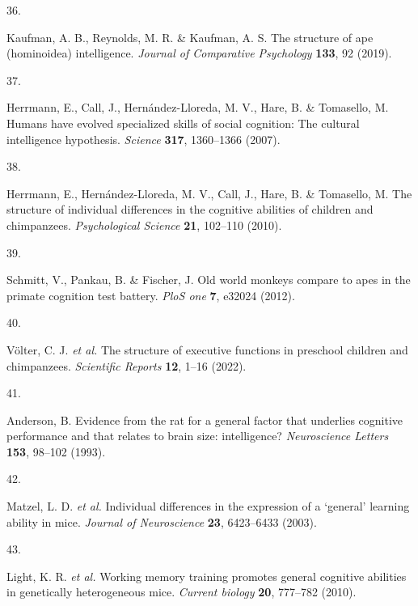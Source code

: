\documentclass[
  man,floatsintext]{apa6}
\newlength{\cslhangindent}
\newlength{\csllabelwidth}
\newlength{\cslentryspacingunit} %
\newenvironment{CSLReferences}[2] %
 {%
  \setlength{\parindent}{0pt}
  \ifodd #1
  \let\oldpar\par
  \def\par{\hangindent=\cslhangindent\oldpar}
  \fi
  \setlength{\parskip}{#2\cslentryspacingunit}
 }%
 {}
\newcommand{\CSLLeftMargin}[1]{\parbox[t]{\csllabelwidth}{#1}}
\newcommand{\CSLRightInline}[1]{\parbox[t]{\linewidth - \csllabelwidth}{#1}\break}
\begin{document}
\begin{CSLReferences}{0}{0}
\leavevmode{}%
\CSLLeftMargin{36. }%
\CSLRightInline{Kaufman, A. B., Reynolds, M. R. \& Kaufman, A. S. The structure of ape (hominoidea) intelligence. \emph{Journal of Comparative Psychology} \textbf{133}, 92 (2019).}

\leavevmode{}%
\CSLLeftMargin{37. }%
\CSLRightInline{Herrmann, E., Call, J., Hernández-Lloreda, M. V., Hare, B. \& Tomasello, M. Humans have evolved specialized skills of social cognition: The cultural intelligence hypothesis. \emph{Science} \textbf{317}, 1360--1366 (2007).}

\leavevmode{}%
\CSLLeftMargin{38. }%
\CSLRightInline{Herrmann, E., Hernández-Lloreda, M. V., Call, J., Hare, B. \& Tomasello, M. The structure of individual differences in the cognitive abilities of children and chimpanzees. \emph{Psychological Science} \textbf{21}, 102--110 (2010).}

\leavevmode{}%
\CSLLeftMargin{39. }%
\CSLRightInline{Schmitt, V., Pankau, B. \& Fischer, J. Old world monkeys compare to apes in the primate cognition test battery. \emph{PloS one} \textbf{7}, e32024 (2012).}

\leavevmode{}%
\CSLLeftMargin{40. }%
\CSLRightInline{Völter, C. J. \emph{et al.} The structure of executive functions in preschool children and chimpanzees. \emph{Scientific Reports} \textbf{12}, 1--16 (2022).}

\leavevmode{}%
\CSLLeftMargin{41. }%
\CSLRightInline{Anderson, B. Evidence from the rat for a general factor that underlies cognitive performance and that relates to brain size: intelligence? \emph{Neuroscience Letters} \textbf{153}, 98--102 (1993).}

\leavevmode{}%
\CSLLeftMargin{42. }%
\CSLRightInline{Matzel, L. D. \emph{et al.} Individual differences in the expression of a {`general'} learning ability in mice. \emph{Journal of Neuroscience} \textbf{23}, 6423--6433 (2003).}

\leavevmode{}%
\CSLLeftMargin{43. }%
\CSLRightInline{Light, K. R. \emph{et al.} Working memory training promotes general cognitive abilities in genetically heterogeneous mice. \emph{Current biology} \textbf{20}, 777--782 (2010).}


\end{CSLReferences}
\end{document}
